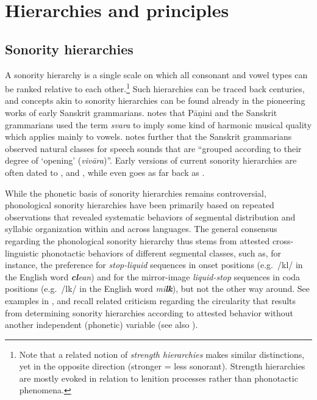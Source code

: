 \section{Hierarchies and principles}\label{sec:hierandprince}

\subsection{Sonority hierarchies}\label{sec:hierarchies}

A sonority hierarchy is a single scale on which all consonant and vowel types can be ranked relative to each other.\footnote{Note that a related notion of \emph{strength hierarchies} makes similar distinctions, yet in the opposite direction (stronger = less sonorant). Strength hierarchies are mostly evoked in relation to lenition processes rather than phonotactic phenomena.}
Such hierarchies can be traced back centuries, and concepts akin to sonority hierarchies can be found already in the pioneering works of early Sanskrit grammarians.
\citet{Donegan1978onthenatural} notes that Pāṇini and the Sanskrit grammarians used the term \emph{svara} to imply some kind of harmonic musical quality which applies mainly to vowels.
\citet[58]{parker2002quantifying} notes further that the Sanskrit grammarians observed natural classes for speech sounds that are \enquote{grouped according to their degree of \enquote{opening} (\emph{vivāra})}.
Early versions of current sonority hierarchies are often dated to \citet{sievers1893grundzugesk, jespersen1899fonetiksk}, and \citet{whitney1865relation}, while \citet{ohala1992alternatives} even goes as far back as \citet{debrosses1765traite}.

While the phonetic basis of sonority hierarchies remains controversial, phonological sonority hierarchies have been primarily based on repeated observations that revealed systematic behaviors of segmental distribution and syllabic organization within and across languages. The general consensus regarding the phonological sonority hierarchy thus stems from attested cross-linguistic phonotactic behaviors of different segmental classes, such as, for instance, the preference for \emph{stop-liquid} sequences in onset positions (e.g.~/kl/ in the English word \emph{\textbf{cl}ean}) and for the mirror-image \emph{liquid-stop} sequences in coda positions (e.g.~/lk/ in the English word \emph{mi\textbf{lk}}), but not the other way around.
See examples in \citet{zwicky1972notesk, selkirk1984majorsk, parker2002quantifying, jany2007universal}, and recall
related criticism regarding the circularity that results from determining sonority hierarchies according to attested behavior without another independent (phonetic) variable (see also \citealt{yin2023frequent}).

